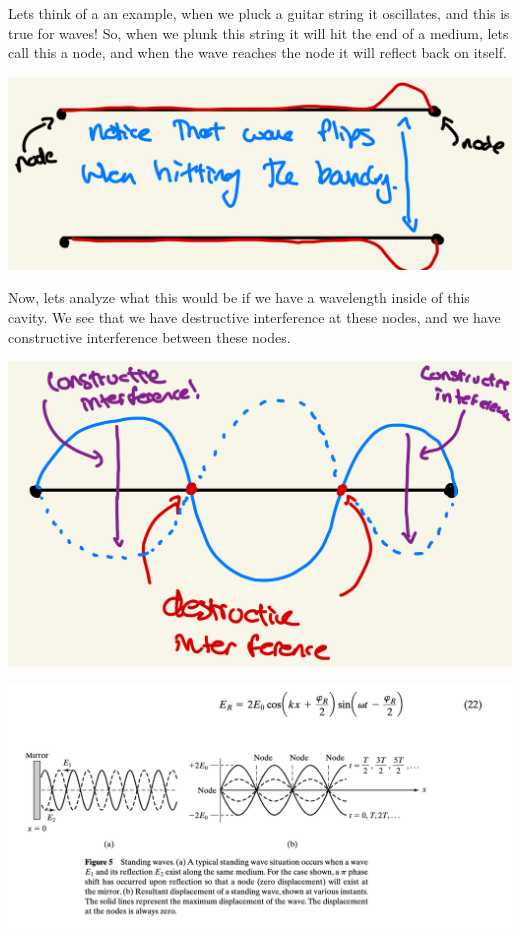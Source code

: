 \documentclass[10pt]{article}
\begin{document}
Lets think of a an example, when we pluck a guitar string it oscillates, and this is true for waves! So, when we plunk this string it will hit the end of a medium, lets call this a node, and when the wave reaches the node it will reflect back on itself.

\begin{center}
    \includegraphics*[scale = .2]{imgs/standing-wave-diagram.jpeg}
\end{center}

Now, lets analyze what this would be if we have a wavelength inside of this cavity. We see that we have destructive interference at these nodes, and we have constructive interference between these nodes.

\begin{center}
    \includegraphics*[scale = .15]{imgs/standing-wave-with-nodes.jpeg}
\end{center}

\newpage

\begin{center}
    \includegraphics*[scale = .75]{imgs/book-standing-wave-diagram.png}
\end{center}
\end{document}
